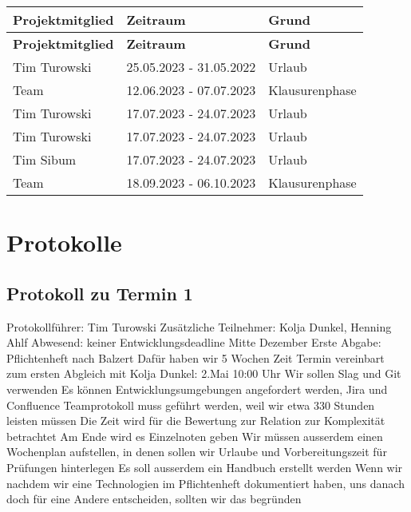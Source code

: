 \begin{flushleft}
		\begin{longtable}{p{4cm}p{6cm}p{8cm}}
            \toprule
            \textbf{Projektmitglied} & \textbf{Zeitraum} & \textbf{Grund} \\
            \midrule\endfirsthead
            \toprule
            \textbf{Projektmitglied} & \textbf{Zeitraum} & \textbf{Grund} \\
            \midrule\endhead
            	Tim Turowski & 25.05.2023 - 31.05.2022 & Urlaub \\ \midrule
				Team & 12.06.2023 - 07.07.2023 & Klausurenphase \\ \midrule
				Tim Turowski & 17.07.2023 - 24.07.2023 & Urlaub \\  \midrule
				Tim Turowski & 17.07.2023 - 24.07.2023 & Urlaub \\ \midrule
				Tim Sibum & 17.07.2023 - 24.07.2023 & Urlaub \\ 
				Team & 18.09.2023 - 06.10.2023 & Klausurenphase \\ \midrule
            \bottomrule
    \end{longtable}
\end{flushleft}

\section{Protokolle}
\subsection{Protokoll zu Termin 1}
Protokollführer: Tim Turowski \newline
Zusätzliche Teilnehmer: Kolja Dunkel, Henning Ahlf \newline
Abwesend: keiner \newline \newline
Entwicklungsdeadline Mitte Dezember \newline
Erste Abgabe: Pflichtenheft nach Balzert \newline
Dafür haben wir 5 Wochen Zeit \newline
Termin vereinbart zum ersten Abgleich mit Kolja Dunkel: 2.Mai 10:00 Uhr \newline
Wir sollen Slag und Git verwenden \newline
Es können Entwicklungsumgebungen angefordert werden, Jira und Confluence \newline
Teamprotokoll muss geführt werden, weil wir etwa 330 Stunden leisten müssen \newline
Die Zeit wird für die Bewertung zur Relation zur Komplexität betrachtet \newline
Am Ende wird es Einzelnoten geben \newline
Wir müssen ausserdem einen Wochenplan aufstellen, in denen sollen wir Urlaube und Vorbereitungszeit für Prüfungen hinterlegen \newline
Es soll ausserdem ein Handbuch erstellt werden \newline
Wenn wir nachdem wir eine Technologien im Pflichtenheft dokumentiert haben, uns danach doch für eine Andere entscheiden, sollten wir das begründen 


